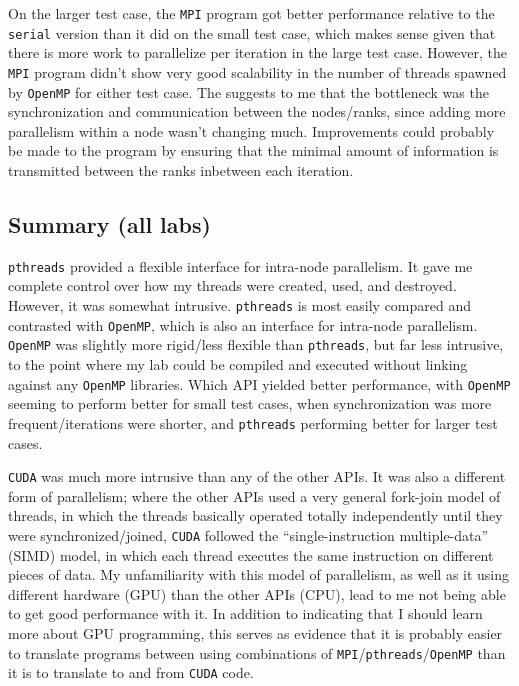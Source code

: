 \documentclass{article}
\begin{document}
On the larger test case, the \texttt{MPI} program got better performance relative to the \texttt{serial} version than it did on the small
test case, which makes sense given that there is more work to parallelize per iteration in the large test case.
However, the \texttt{MPI} program didn't show very good scalability in the number of threads spawned by \texttt{OpenMP} for either test case.
The suggests to me that the bottleneck was the synchronization and communication between the nodes/ranks, since adding more parallelism within
a node wasn't changing much. Improvements could probably be made to the program by ensuring that the minimal amount of information
is transmitted between the ranks inbetween each iteration.

\subsection*{Summary (all labs)}

\texttt{pthreads} provided a flexible interface for intra-node parallelism. It gave me complete control
over how my threads were created, used, and destroyed. However, it was somewhat intrusive. \texttt{pthreads}
is most easily compared and contrasted with \texttt{OpenMP}, which is also an interface for intra-node
parallelism. \texttt{OpenMP} was slightly more rigid/less flexible than \texttt{pthreads}, but far
less intrusive, to the point where my lab could be compiled and executed without linking against
any \texttt{OpenMP} libraries. Which API yielded better performance, with \texttt{OpenMP} seeming to perform
better for small test cases, when synchronization was more frequent/iterations were shorter, and \texttt{pthreads}
performing better for larger test cases.

\texttt{CUDA} was much more intrusive than any of the other APIs. It was also a different form of parallelism;
where the other APIs used a very general fork-join model of threads, in which the threads basically operated totally
independently until they were synchronized/joined, \texttt{CUDA} followed the ``single-instruction multiple-data'' (SIMD) model,
in which each thread executes the same instruction on different pieces of data. My unfamiliarity with this model of parallelism,
as well as it using different hardware (GPU) than the other APIs (CPU), lead to me not being able to get good performance with it.
In addition to indicating that I should learn more about GPU programming, this serves as evidence that it is probably easier
to translate programs between using combinations of \texttt{MPI}/\texttt{pthreads}/\texttt{OpenMP} than it is to translate
to and from \texttt{CUDA} code.
\end{document}
